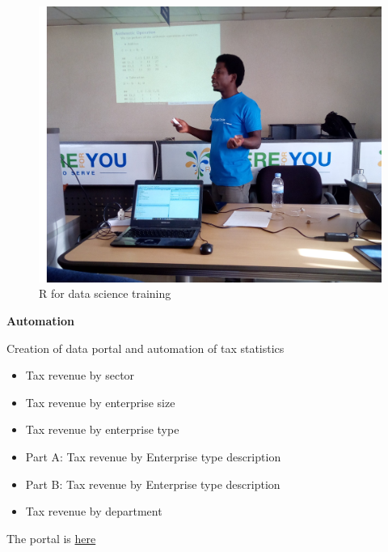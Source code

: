 \documentclass[ignorenonframetext,]{beamer}
\providecommand{\tightlist}{%
  \setlength{\itemsep}{0pt}\setlength{\parskip}{0pt}}
\begin{document}
\begin{frame}

\begin{figure}
\centering
\includegraphics{Images/training_2.jpg}
\caption{R for data science training}
\end{figure}

\end{frame}

\begin{frame}

\begin{center}
\textbf{Automation}
\end{center}

\end{frame}

\begin{frame}{Creation of data portal and automation of tax statistics}

\begin{itemize}
\tightlist
\item
  Tax revenue by sector
\item
  Tax revenue by enterprise size
\item
  Tax revenue by enterprise type
\item
  Part A: Tax revenue by Enterprise type description
\item
  Part B: Tax revenue by Enterprise type description
\item
  Tax revenue by department
\end{itemize}

The portal is \href{https://bit.ly/taxrevenue}{here}

\end{frame}
\end{document}
